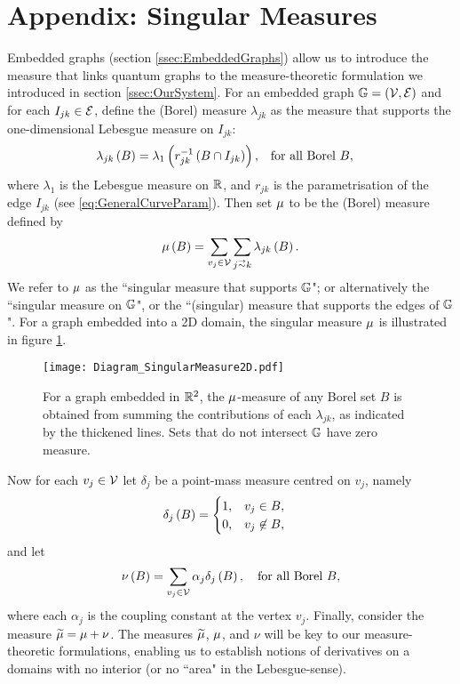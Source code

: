 \section{Appendix: Singular Measures} \label{app:SingularMeasures}
Embedded graphs (section \ref{ssec:EmbeddedGraphs}) allow us to introduce the measure that links quantum graphs to the measure-theoretic formulation we introduced in section \ref{ssec:OurSystem}.
For an embedded graph $\mathbb{G} = \left( \mathcal{V},\mathcal{E} \right)$ and for each $I_{jk}\in \mathcal{E}$, define the (Borel) measure $\lambda_{jk}$ as the measure that supports the one-dimensional Lebesgue measure on $I_{jk}$:
\begin{align*}
	\lambda_{jk}\left( B \right) = \lambda_{1}\left( r_{jk}^{-1}\left( B \cap I_{jk} \right) \right),
	&\quad\text{for all Borel } B,
\end{align*}
where $\lambda_1$ is the Lebesgue measure on $\mathbb{R}$, and $r_{jk}$ is the parametrisation of the edge $I_{jk}$ (see \eqref{eq:GeneralCurveParam}).
Then set $\mu$ to be the (Borel) measure defined by
\begin{align*}
	\ddmes\bracs{B} = \sum_{v_j\in \vertSet}\sum_{j\conLeft k} \lambda_{jk}\bracs{B}.
\end{align*}
We refer to $\mu$ as the ``singular measure that supports $\mathbb{G}$"; or alternatively the ``singular measure on $\mathbb{G}$", or the ``(singular) measure that supports the edges of $\mathbb{G}$".
For a graph embedded into a 2D domain, the singular measure $\mu$ is illustrated in figure \ref{fig:Diagram_SingularMeasure2D}.
\begin{figure}[b!]
	\centering
	\texttt{[image: Diagram\_SingularMeasure2D.pdf]}
	\caption{\label{fig:Diagram_SingularMeasure2D} For a graph embedded in $\mathbb{R}^2$, the $\mu$-measure of any Borel set $B$ is obtained from summing the contributions of each $\lambda_{jk}$, as indicated by the thickened lines.
	Sets that do not intersect $\mathbb{G}$ have zero measure.}
\end{figure}

Now for each $v_j\in\mathcal{V}$ let $\delta_j$ be a point-mass measure centred on $v_j$, namely
\begin{align*}
	\delta_j\left( B \right) &= \begin{cases} 1, & v_j\in B, \\ 0, & v_j\not\in B, \end{cases}
\end{align*}
and let
\begin{align*}
	\nu\left( B \right) = \sum_{v_j\in\mathcal{V}}\alpha_j\delta_j\left( B \right),
	\quad\text{for all Borel } B,
\end{align*}
where each $\alpha_j$ is the coupling constant at the vertex $v_j$.
Finally, consider the measure $\widetilde{\mu} = \mu + \nu$.
The measures $\widetilde{\mu}$, $\mu$, and $\nu$ will be key to our measure-theoretic formulations, enabling us to establish notions of derivatives on a domains with no interior (or no ``area" in the Lebesgue-sense).